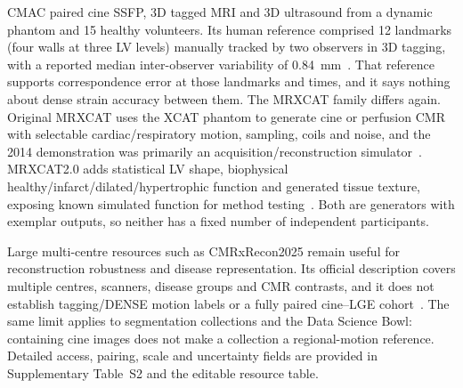 CMAC paired cine SSFP, 3D tagged MRI and 3D ultrasound from a dynamic phantom and 15 healthy volunteers. Its human reference comprised 12 landmarks (four walls at three LV levels) manually tracked by two observers in 3D tagging, with a reported median inter-observer variability of 0.84~mm~\cite{tobongomez2013cmac,cmac2011}. That reference supports correspondence error at those landmarks and times, and it says nothing about dense strain accuracy between them. The MRXCAT family differs again. Original MRXCAT uses the XCAT phantom to generate cine or perfusion CMR with selectable cardiac/respiratory motion, sampling, coils and noise, and the 2014 demonstration was primarily an acquisition/reconstruction simulator~\cite{wissmann2014mrxcat}. MRXCAT2.0 adds statistical LV shape, biophysical healthy/infarct/dilated/hypertrophic function and generated tissue texture, exposing known simulated function for method testing~\cite{mrxcat2023,mrxcat2repo}. Both are generators with exemplar outputs, so neither has a fixed number of independent participants.

Large multi-centre resources such as CMRxRecon2025 remain useful for reconstruction robustness and disease representation. Its official description covers multiple centres, scanners, disease groups and CMR contrasts, and it does not establish tagging/DENSE motion labels or a fully paired cine--LGE cohort~\cite{cmrxrecon2025official}. The same limit applies to segmentation collections and the Data Science Bowl: containing cine images does not make a collection a regional-motion reference. Detailed access, pairing, scale and uncertainty fields are provided in Supplementary Table~S2 and the editable resource table.

